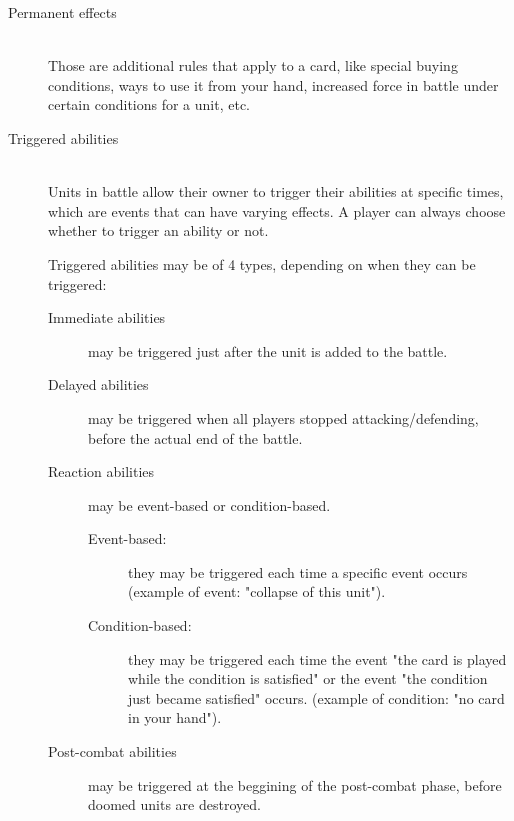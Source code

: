 \documentclass[a4paper]{article}
\begin{document}
    \begin{description}
        \item[Permanent effects] \hfill \\
        	Those are additional rules that apply to a card,
            like special buying conditions, ways to use it from your hand, 
            increased force in battle under certain conditions for a unit, etc.
        \item[Triggered abilities] \hfill \\
            Units in battle allow their owner to trigger their abilities at
            specific times, which are events that can have varying effects.
            A player can always choose whether to trigger an ability or not.
            
            Triggered abilities may be of 4 types,
            depending on when they can be triggered:
            \begin{description}
        	        \item[Immediate abilities]
                    	may be triggered just after the unit is added to the battle.
        	        \item[Delayed abilities]
                    may be triggered when all players stopped attacking/defending,
	                before the actual end of the battle.
        	        \item[Reaction abilities] may be event-based or condition-based.
	            \begin{description}
                        \item[Event-based:]
                        they may be triggered each time a specific event occurs
                        (example of event: "collapse of this unit").
                        \item[Condition-based:]
                        they may be triggered each time the event
                        "the card is played while the condition is satisfied" or the
                        event "the condition just became satisfied" occurs.
                        (example of condition: "no card in your hand").
                    \end{description}
        	        \item[Post-combat abilities] may be triggered at the beggining of the
                    post-combat phase, before doomed units are destroyed.
            \end{description}
    \end{description}
    
\end{document}
